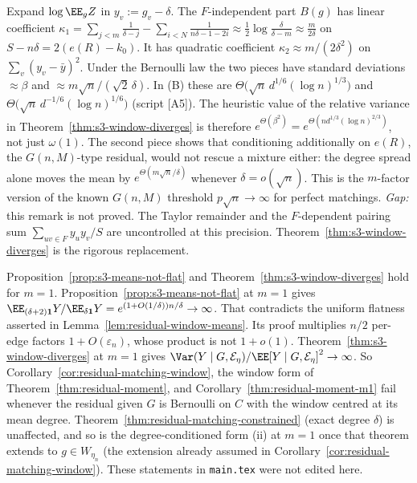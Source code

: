 \begin{remark}
\label{rem:s3-typical}
Expand \(\log\EE_gZ\) in \(y_v:=g_v-\delta\). The \(F\)-independent part \(B(g)\) has
linear coefficient
\(\kappa_1=\sum_{j<m}\frac1{\delta-j}-\sum_{i<N}\frac1{n\delta-1-2i}\approx\frac12\log\frac\delta{\delta-m}\approx\frac m{2\delta}\)
on \(S-n\delta=2(e(R)-k_0)\). It has quadratic coefficient
\(\kappa_2\approx m/(2\delta^2)\) on \(\sum_v(y_v-\bar y)^2\). Under the Bernoulli
law the two pieces have standard deviations \(\approx\beta\) and
\(\approx m\sqrt n/(\sqrt2\,\delta)\). In (B) these are
\(\Theta\bigl(\sqrt n\,d^{1/6}(\log n)^{1/3}\bigr)\) and
\(\Theta\bigl(\sqrt n\,d^{-1/6}(\log n)^{1/6}\bigr)\) (script [A5]). The heuristic value of
the relative variance in Theorem~\ref{thm:s3-window-diverges} is therefore
\(e^{\Theta(\beta^2)}=e^{\Theta(nd^{1/3}(\log n)^{2/3})}\), not just \(\omega(1)\). The second
piece shows that conditioning additionally on \(e(R)\), the \(G(n,M)\)-type residual,
would not rescue a mixture either: the degree spread alone moves the mean by
\(e^{\Theta(m\sqrt n/\delta)}\) whenever \(\delta=o(\sqrt n)\). This is the \(m\)-factor version of
the known \(G(n,M)\) threshold \(p\sqrt n\to\infty\) for perfect matchings.
\emph{Gap:} this remark is not proved. The Taylor remainder and the
\(F\)-dependent pairing sum \(\sum_{uv\in F}y_uy_v/S\) are uncontrolled at this
precision. Theorem~\ref{thm:s3-window-diverges} is the rigorous replacement.
\end{remark}

\begin{remark}[Consequences at \(m=1\)]
\label{rem:s3-m1}
Proposition~\ref{prop:s3-means-not-flat} and Theorem~\ref{thm:s3-window-diverges} hold for
\(m=1\). Proposition~\ref{prop:s3-means-not-flat} at \(m=1\) gives
\(\EE_{(\delta+2)\mathbf 1}Y/\EE_{\delta\mathbf 1}Y=e^{(1+O(1/\delta))n/\delta}\to\infty\). That
contradicts the uniform flatness asserted in Lemma~\ref{lem:residual-window-means}.
Its proof multiplies \(n/2\) per-edge factors \(1+O(\varepsilon_n)\), whose product is
not \(1+o(1)\). Theorem~\ref{thm:s3-window-diverges} at \(m=1\) gives
\(\Var(Y\mid G,\mathcal E_\eta)/\EE[Y\mid G,\mathcal E_\eta]^2\to\infty\). So
Corollary~\ref{cor:residual-matching-window}, the window form of
Theorem~\ref{thm:residual-moment}, and Corollary~\ref{thm:residual-moment-m1} fail whenever
the residual given \(G\) is Bernoulli on \(C\) with the window centred at its mean
degree. Theorem~\ref{thm:residual-matching-constrained} (exact degree \(\delta\)) is
unaffected, and so is the degree-conditioned form (ii) at \(m=1\) once that theorem
extends to \(g\in W_{\eta_n}\) (the extension already assumed in
Corollary~\ref{cor:residual-matching-window}). These statements in \texttt{main.tex}
were not edited here.
\end{remark}

